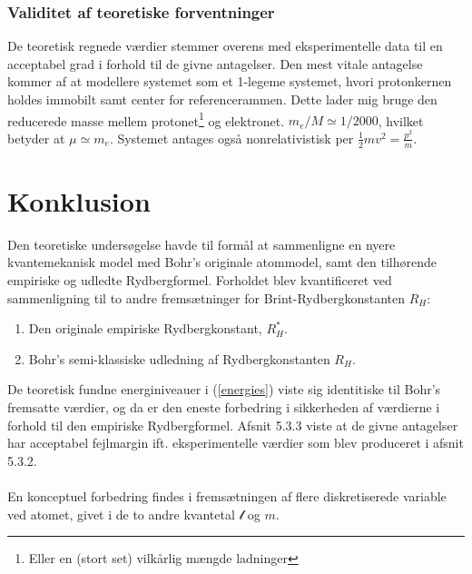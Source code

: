 \documentclass[12pt]{article}
\theoremstyle{definition}
\theoremstyle{remark}
\theoremstyle{definition}
\numberwithin{equation}{section}
\begin{document}
\subsubsection{Validitet af teoretiske forventninger}
De teoretisk regnede værdier stemmer overens med eksperimentelle data til en acceptabel grad i forhold til de givne antagelser. Den mest vitale antagelse kommer af at modellere systemet som et 1-legeme systemet, hvori protonkernen holdes immobilt samt center for referencerammen. Dette lader mig bruge den reducerede masse mellem protonet\footnote{Eller en (stort set) vilkårlig mængde ladninger} og elektronet. $m_e/M\simeq 1/2000$, hvilket betyder at $\mu \simeq m_e$. Systemet antages også nonrelativistisk per $ \frac{1}{2}mv^2 = \frac{p^2}{m}$. 

\section{Konklusion}
Den teoretiske undersøgelse havde til formål at sammenligne en nyere kvantemekanisk model med Bohr's originale atommodel, samt den tilhørende empiriske og udledte Rydbergformel. Forholdet blev kvantificeret ved sammenligning til to andre fremsætninger for Brint-Rydbergkonstanten $R_H$:
\begin{enumerate}
    \item Den originale empiriske Rydbergkonstant, $R^*_H$. 
    \item Bohr's semi-klassiske udledning af Rydbergkonstanten $R_H$.
\end{enumerate}
De teoretisk fundne energiniveauer i (\ref{energies}) viste sig identitiske til Bohr's fremsatte værdier, og da er den eneste forbedring i sikkerheden af værdierne i forhold til den empiriske Rydbergformel. Afsnit 5.3.3 viste at de givne antagelser har acceptabel fejlmargin ift. eksperimentelle værdier som blev produceret i afsnit 5.3.2.
\\\\
En konceptuel forbedring findes i fremsætningen af flere diskretiserede variable ved atomet, givet i de to andre kvantetal $\mathscr l$ og $m$. 

\newpage
\nocite{*}
\printbibliography
\end{document}
